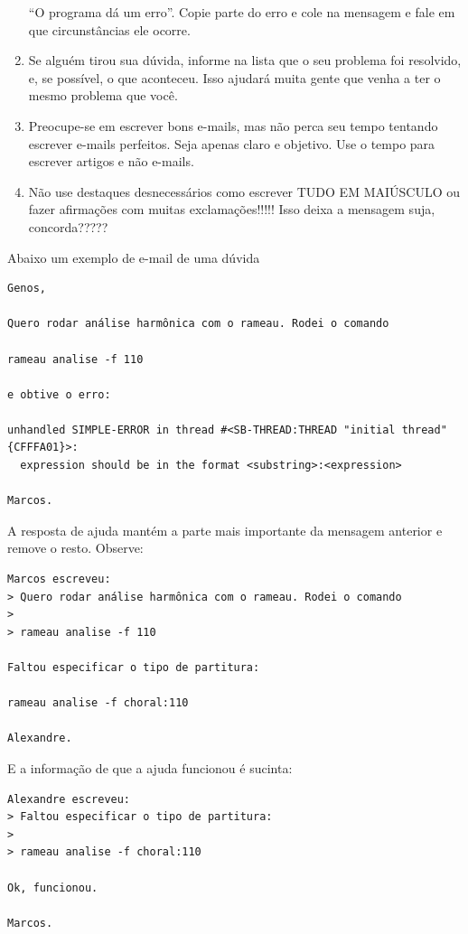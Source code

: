 \documentclass[12pt,brazil]{book}
\begin{document}
\begin{enumerate}
  ``O programa dá um erro''. Copie parte do erro e cole na mensagem e
  fale em que circunstâncias ele ocorre.
\item Se alguém tirou sua dúvida, informe na lista que o seu problema
  foi resolvido, e, se possível, o que aconteceu. Isso ajudará muita
  gente que venha a ter o mesmo problema que você.
\item Preocupe-se em escrever bons e-mails, mas não perca seu tempo
  tentando escrever e-mails perfeitos. Seja apenas claro e
  objetivo. Use o tempo para escrever artigos e não e-mails.
\item Não use destaques desnecessários como escrever TUDO EM MAIÚSCULO
  ou fazer afirmações com muitas exclamações!!!!! Isso deixa a
  mensagem suja, concorda?????
\end{enumerate}

Abaixo um exemplo de e-mail de uma dúvida

\begin{verbatim}
Genos,

Quero rodar análise harmônica com o rameau. Rodei o comando

rameau analise -f 110

e obtive o erro:

unhandled SIMPLE-ERROR in thread #<SB-THREAD:THREAD "initial thread" {CFFFA01}>:
  expression should be in the format <substring>:<expression>

Marcos.
\end{verbatim}

A resposta de ajuda mantém a parte mais importante da mensagem
anterior e remove o resto. Observe:

\begin{verbatim}
Marcos escreveu:
> Quero rodar análise harmônica com o rameau. Rodei o comando
> 
> rameau analise -f 110

Faltou especificar o tipo de partitura:

rameau analise -f choral:110

Alexandre.
\end{verbatim}

E a informação de que a ajuda funcionou é sucinta:

\begin{verbatim}
Alexandre escreveu:
> Faltou especificar o tipo de partitura:
> 
> rameau analise -f choral:110

Ok, funcionou.

Marcos.
\end{verbatim}
\end{document}
